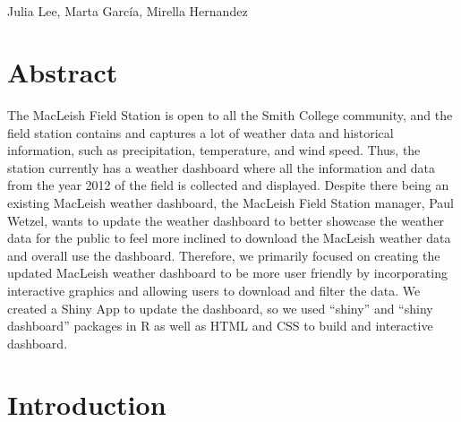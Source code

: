 \documentclass[10pt,letterpaper]{article}
\begin{document}
\vspace*{0.2in}

\begin{flushleft}
{\Large
\textbf{} %
}
\newline
\\
Julia Lee\textsuperscript{},
Marta García\textsuperscript{},
Mirella Hernandez\textsuperscript{}\\
\bigskip
\bigskip
\end{flushleft}
\section*{Abstract}
The MacLeish Field Station is open to all the Smith College community,
and the field station contains and captures a lot of weather data and
historical information, such as precipitation, temperature, and wind
speed. Thus, the station currently has a weather dashboard where all the
information and data from the year 2012 of the field is collected and
displayed. Despite there being an existing MacLeish weather dashboard,
the MacLeish Field Station manager, Paul Wetzel, wants to update the
weather dashboard to better showcase the weather data for the public to
feel more inclined to download the MacLeish weather data and overall use
the dashboard. Therefore, we primarily focused on creating the updated
MacLeish weather dashboard to be more user friendly by incorporating
interactive graphics and allowing users to download and filter the data.
We created a Shiny App to update the dashboard, so we used ``shiny'' and
``shiny dashboard'' packages in R as well as HTML and CSS to build and
interactive dashboard.


\linenumbers

\section{Introduction}\label{introduction}
\end{document}
